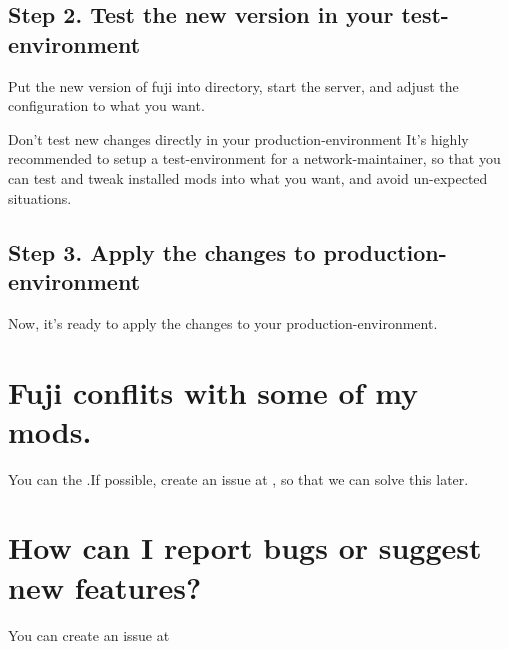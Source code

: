 \subsection{Step 2. Test the new version in your test-environment}
Put the new version of fuji into  directory, start the server, and adjust the configuration to what you want.

\begin{warn}{Don't test new changes directly in your production-environment}
    It's highly recommended to setup a test-environment for a network-maintainer, so that you can test and tweak installed mods into what you want, and avoid un-expected situations.
\end{warn}

\subsection{Step 3. Apply the changes to production-environment}
Now, it's ready to apply the changes to your production-environment.


\section{Fuji conflits with some of my mods.}
You can  the .If possible, create an issue at \issueurl, so that we can solve this later.


\section{How can I report bugs or suggest new features?}
You can create an issue at \issueurl



